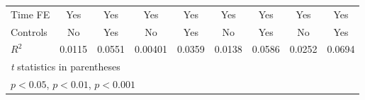 {\begin{tabular}{l*{8}{c}}
Time FE         &      Yes         &      Yes         &      Yes         &      Yes         &      Yes         &      Yes         &      Yes         &      Yes         \\
Controls        &       No         &      Yes         &       No         &      Yes         &       No         &      Yes         &       No         &      Yes         \\
$ R^2 $         &   0.0115         &   0.0551         &  0.00401         &   0.0359         &   0.0138         &   0.0586         &   0.0252         &   0.0694         \\
\hline\hline
\multicolumn{9}{l}{\footnotesize \textit{t} statistics in parentheses}\\
\multicolumn{9}{l}{\footnotesize \sym{*} \(p<0.05\), \sym{**} \(p<0.01\), \sym{***} \(p<0.001\)}\\
\end{tabular}
}
